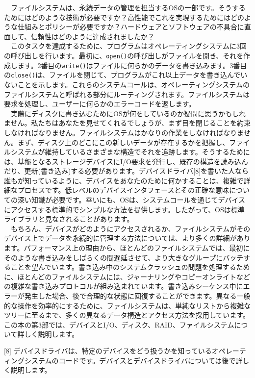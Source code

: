 　ファイルシステムは、永続データの管理を担当するOSの一部です。そうするためにはどのような技術が必要ですか？高性能でこれを実現するためにはどのような仕組みとポリシーが必要ですか？ハードウェアとソフトウェアの不具合に直面して、信頼性はどのように達成されましたか？\\
　このタスクを達成するために、プログラムはオペレーティングシステムに3回の呼び出しを行います。最初に、\texttt{open()}の呼び出しがファイルを開き、それを作成します。2番目の\texttt{write()}はファイルに何らかのデータを書き込みます。3番目の\texttt{close()}は、ファイルを閉じて、プログラムがこれ以上データを書き込んでいないことを示します。これらのシステムコールは、オペレーティングシステムのファイルシステムと呼ばれる部分にルーティングされます。ファイルシステムは要求を処理し、ユーザーに何らかのエラーコードを返します。\\
　実際にディスクに書き込むためにOSが何をしているのか疑問に思うかもしれません。私たちはあなたを見せてくれるでしょうが、まず目を閉じることを約束しなければなりません。ファイルシステムはかなりの作業をしなければなりません。まず、ディスク上のどこにこの新しいデータが存在するかを把握し、ファイルシステムが維持しているさまざまな構造でそれを追跡します。そうするためには、基盤となるストレージデバイスにI/O要求を発行し、既存の構造を読み込んだり、更新(書き込み)する必要があります。デバイスドライバ{[}8{]}を書いた人なら誰もが知っているように、デバイスをあなたのために何かすることは、複雑で詳細なプロセスです。低レベルのデバイスインタフェースとその正確な意味についての深い知識が必要です。幸いにも、OSは、システムコールを通じてデバイスにアクセスする標準的でシンプルな方法を提供します。したがって、OSは標準ライブラリと見なされることがあります。\\
　もちろん、デバイスがどのようにアクセスされるか、ファイルシステムがそのデバイス上でデータを永続的に管理する方法については、より多くの詳細があります。パフォーマンス上の理由から、ほとんどのファイルシステムでは、最初にそのような書き込みをしばらくの間遅延させて、より大きなグループにバッチすることを望んでいます。書き込み中のシステムクラッシュの問題を処理するために、ほとんどのファイルシステムには、ジャーナリングやコピーオンライトなどの複雑な書き込みプロトコルが組み込まれています。書き込みシーケンス中にエラーが発生した場合、後で合理的な状態に回復することができます。異なる一般的な操作を効率的にするために、ファイルシステムは、単純なリストから複雑なツリーに至るまで、多くの異なるデータ構造とアクセス方法を採用しています。この本の第3部では、デバイスとI/O、ディスク、RAID、ファイルシステムについて詳しく説明します。

{[}8{]}
デバイスドライバは、特定のデバイスをどう扱うかを知っているオペレーティングシステムのコードです。デバイスとデバイスドライバについては後で詳しく説明します。

